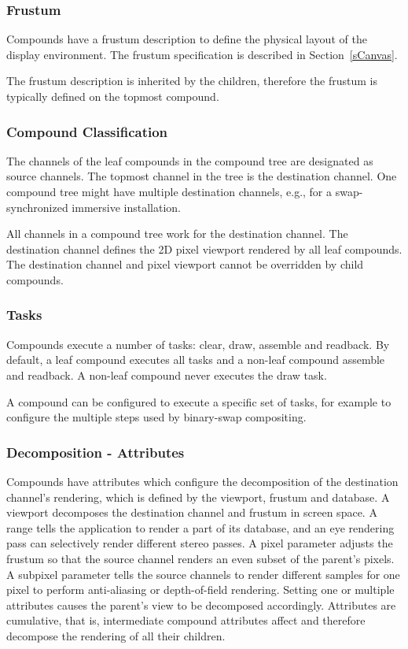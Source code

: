 \documentclass[10pt,a4]{scrartcl}
\newcommand{\sref}[1]{Section~\ref{#1}}
\begin{document}
\subsubsection{\label{sFrustum}Frustum}

Compounds have a frustum description to define the physical layout of
the display environment. The frustum specification is described in
\sref{sCanvas}.

The frustum description is inherited by the children, therefore the
frustum is typically defined on the topmost compound. 

\subsubsection{Compound Classification}
The channels of the leaf compounds in the compound tree are designated
as source channels. The topmost channel in the tree is the destination
channel. One compound tree might have multiple destination channels,
e.g., for a swap-synchronized immersive installation. 

All channels in a compound tree work for the destination channel. The
destination channel defines the 2D pixel viewport rendered by all leaf
compounds. The destination channel and pixel viewport cannot be
overridden by child compounds.

\subsubsection{Tasks}
Compounds execute a number of tasks: clear, draw, assemble and
readback. By default, a leaf compound executes all tasks and a non-leaf
compound assemble and readback. A non-leaf compound never executes the
draw task.

A compound can be configured to execute a specific set of tasks, for
example to configure the multiple steps used by binary-swap compositing.

\subsubsection{Decomposition - Attributes}
Compounds have attributes which configure the decomposition of the destination
channel's rendering, which is defined by the viewport, frustum and database. A
\textsf{viewport} decomposes the destination channel and frustum in screen
space. A \textsf{range} tells the application to render a part of its database,
and an \textsf{eye} rendering pass can selectively render different stereo
passes. A \textsf{pixel} parameter adjusts the frustum so that the source
channel renders an even subset of the parent's pixels. A \textsf{subpixel}
parameter tells the source channels to render different samples for one pixel to
perform anti-aliasing or depth-of-field rendering. Setting one or multiple
attributes causes the parent's view to be decomposed accordingly. Attributes are
cumulative, that is, intermediate compound attributes affect and therefore
decompose the rendering of all their children.
\end{document}
